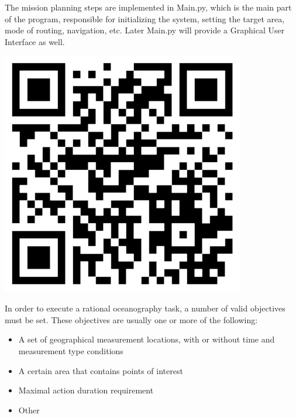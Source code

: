 \begin{tcolorbox}[colback=cyan!5,colframe=cyan!40!black,title=Code: Main.py \\ https://www.dropbox.com/s/h1067ywmdajkegk/Main.py]
\begin{minipage}{0,6\textwidth}
The mission planning steps are implemented in Main.py, which is the main part of the program, responsible for initializing the system, setting the target area, mode of routing, navigation, etc. Later Main.py will provide a Graphical User Interface as well.
\end{minipage}
\begin{minipage}{0,35\textwidth}
\raggedleft
\includegraphics[width=0.8\textwidth]{img/main}
\end{minipage}

\end{tcolorbox}

In order to execute a rational oceanography task, a number of valid objectives must be set. These objectives are usually one or more of the following\cite{oceanography}:

\begin{itemize}
\item A set of geographical measurement locations, with or without time and measurement type conditions
\item A certain area that contains points of interest
\item Maximal action duration requirement
\item Other
\end{itemize}

